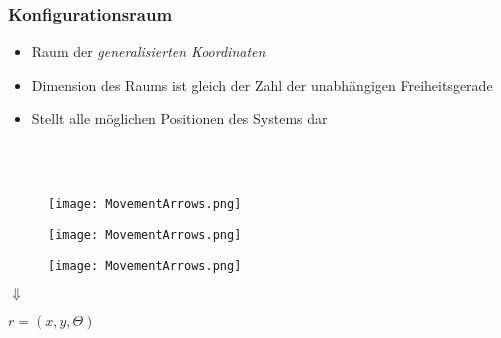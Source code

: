 \documentclass{beamer}
\begin{document}
\begin{frame}
\frametitle{Konfigurationsraum}
\begin{itemize}

\item Raum der \textit{generalisierten Koordinaten} 
\item Dimension des Raums ist gleich der Zahl der unabhängigen Freiheitsgerade 
\item Stellt alle möglichen Positionen des Systems dar \\ %
\end{itemize}
\quad \\
\quad \\


\end{frame}

\begin{frame}


\begin{block}{}
 \begin{figure}[h]
\centering
 \texttt{[image: MovementArrows.png]}
 \end{figure}
\end{block}

\end{frame}

\begin{frame}

 \begin{block}{}
\begin{figure}[h]
\centering
 \texttt{[image: MovementArrows.png]}
 \end{figure}
   \end{block}
\begin{block}{}
\qquad \qquad \qquad {} \qquad \qquad {} \qquad \qquad \qquad \quad  {\huge $\Theta$}
\end{block}

\end{frame}

\begin{frame}

 \begin{block}{}
\begin{figure}[h]
\centering
 \texttt{[image: MovementArrows.png]}
 \end{figure}
   \end{block}
\begin{block}{}
\qquad \qquad \qquad {} \qquad \qquad {} \qquad \qquad \qquad \quad  {\huge $\Theta$}
\end{block}
\begin{center}
{\Huge$\Downarrow$}
\end{center}
\begin{center}
{\huge $r = (x,y,\Theta)$}
\end{center}


\end{frame}
\end{document}
